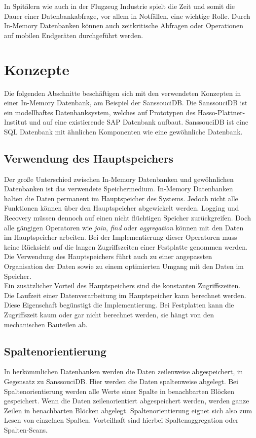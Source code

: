 \documentclass[draft,final]{vutinfth} %
\begin{document}
In Spitälern wie auch in der Flugzeug Industrie spielt die Zeit und somit die Dauer einer Datenbankabfrage, vor allem in Notfällen, eine wichtige Rolle. Durch In-Memory Datenbanken können auch zeitkritische Abfragen oder Operationen auf mobilen Endgeräten durchgeführt werden.
\section{Konzepte}
Die folgenden Abschnitte beschäftigen sich mit den verwendeten Konzepten in einer In-Memory Datenbank, am Beispiel der SanssouciDB. Die SanssouciDB ist ein modellhaftes Datenbanksystem, welches auf Prototypen des Hasso-Plattner-Institut und auf eine existierende SAP Datenbank aufbaut. SanssouciDB ist eine SQL Datenbank mit ähnlichen Komponenten wie eine gewöhnliche Datenbank.

\subsection{Verwendung des Hauptspeichers}
Der gro\ss e Unterschied zwischen In-Memory Datenbanken und gewöhnlichen Datenbanken ist das verwendete Speichermedium. In-Memory Datenbanken halten die Daten permanent im Hauptspeicher des Systems. Jedoch nicht alle Funktionen können über den Hauptspeicher abgewickelt werden. Logging und Recovery müssen dennoch auf einen nicht flüchtigen Speicher zurückgreifen. Doch alle gängigen Operatoren wie \textit{join}, \textit{find} oder \textit{aggregation} können mit den Daten im Hauptspeicher arbeiten. Bei der Implementierung dieser Operatoren muss keine Rücksicht auf die langen Zugriffszeiten einer Festplatte genommen werden. Die Verwendung des Hauptspeichers führt auch zu einer angepassten Organisation der Daten sowie zu einem optimierten Umgang mit den Daten im Speicher. \\
Ein zusätzlicher Vorteil des Hauptspeichers sind die konstanten Zugriffszeiten. Die Laufzeit einer Datenverarbeitung im Hauptspeicher kann berechnet werden. Diese Eigenschaft begünstigt die Implementierung. Bei Festplatten kann die Zugriffszeit kaum oder gar nicht berechnet werden, sie hängt von den mechanischen Bauteilen ab.

\subsection{Spaltenorientierung}
In herkömmlichen Datenbanken werden die Daten zeilenweise abgespeichert, in Gegensatz zu SanssouciDB. Hier werden die Daten spaltenweise abgelegt. Bei Spaltenorientierung werden alle Werte einer Spalte in benachbarten Blöcken gespeichert. Wenn die Daten zeilenorientiert abgespeichert werden, werden ganze Zeilen in benachbarten Blöcken abgelegt. Spaltenorientierung eignet sich also zum Lesen von einzelnen Spalten. Vorteilhaft sind hierbei Spaltenaggregation oder Spalten-Scans.
\end{document}
